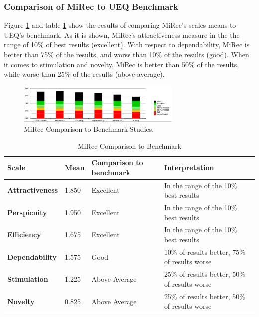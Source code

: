 \subsubsection{Comparison of MiRec to UEQ Benchmark}
Figure \ref{fig:figure57} and table \ref{table:table54} show the results of
comparing MiRec's scales means to UEQ's benchmark. As it is shown, MiRec's
attractiveness measure in the the range of 10\% of best results (excellent).
With respect to dependability, MiRec is better than 75\% of the results, and
worse than 10\% of the results (good). When it comes to stimulation and novelty,
MiRec is better than 50\% of the results, while worse than 25\% of the results
(above average). 
\begin{figure}[!htbp]
\centering
\includegraphics[width=0.7\textwidth]{figures/mirec-benchmark}
\caption{MiRec Comparison to Benchmark Studies.}
\label{fig:figure57}
\end{figure}
\begin{table}[!htbp]
\tiny
\centering
\begin{tabular}{|l|l|l|l|}
\hline
\textbf{Scale}          & \textbf{Mean} & \textbf{Comparison to benchmark} & \textbf{Interpretation}                       \\ \hline
\textbf{Attractiveness} & 1.850         & Excellent                         & In the range of the 10\% best results         \\ \hline
\textbf{Perspicuity}    & 1.950         & Excellent                         & In the range of the 10\% best results         \\ \hline
\textbf{Efficiency}     & 1.675         & Excellent                         & In the range of the 10\% best results         \\ \hline
\textbf{Dependability}  & 1.575         & Good                              & 10\% of results better, 75\% of results worse \\ \hline
\textbf{Stimulation}    & 1.225         & Above Average                     & 25\% of results better, 50\% of results worse \\ \hline
\textbf{Novelty}        & 0.825         & Above Average                     & 25\% of results better, 50\% of results worse \\ \hline
\end{tabular}
\caption{MiRec Comparison to Benchmark}
\label{table:table54}
\end{table}

